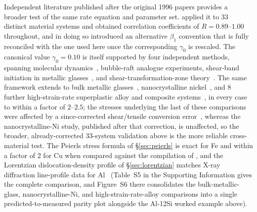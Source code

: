 \documentclass[3p]{elsarticle}
\newcommand{\gz}{\gamma_0}
\begin{document}
Independent literature published after the original 1996 papers
provides a broader test of the same rate equation and parameter
set. \citet{sripathi2014} applied it to 33
distinct material systems and obtained correlation coefficients of
$R=0.89$--$1.00$ throughout, and in doing so introduced an
alternative $\beta_1$ convention that is fully reconciled with the
one used here once the corresponding $\gz$ is rescaled. The canonical
value $\gz=0.10$ is itself supported by four independent methods,
spanning molecular dynamics~\citep{wolf1990}, bubble-raft analogue
experiments, shear-band initiation in metallic
glasses~\citep{argon1979}, and shear-transformation-zone
theory~\citep{falk-langer1998}. The same framework extends to bulk
metallic glasses~\citep{buenz2015}, nanocrystalline
nickel~\citep{pad2018}, and 8 further high-strain-rate superplastic
alloy and composite systems~\citep{padbasariya2009}, in every case to
within a factor of $2$--$2.5$; the stresses underlying the last of
these comparisons were affected by a since-corrected shear/tensile
conversion error~\citep{sripathi2014}, whereas the nanocrystalline-Ni
study, published after that correction, is unaffected, so the
broader, already-corrected 33-system validation above is the more
reliable cross-material test. The Peierls stress formula of
\S\ref{sec:peierls} is exact for Fe and within a factor of 2 for Cu
when compared against the compilation of
\citet{nabarro1997}, and the Lorentzian dislocation-density
profile of \S\ref{sec:lorentzian} matches X-ray diffraction
line-profile data for Al~\citep{vermeulen1995} (Table~S5 in the
Supporting Information gives the complete comparison, and
Figure~S6 there consolidates the bulk-metallic-glass,
nanocrystalline-Ni, and high-strain-rate-alloy comparisons into a
single predicted-to-measured parity plot alongside the Al-12Si worked
example above).
\end{document}
